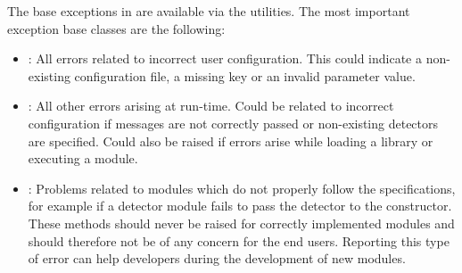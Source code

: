 The base exceptions in \apsq are available via the utilities.
The most important exception base classes are the following:
\begin{itemize}
\item {}: All errors related to incorrect user configuration.
This could indicate a non-existing configuration file, a missing key or an invalid parameter value.
\item {}: All other errors arising at run-time.
Could be related to incorrect configuration if messages are not correctly passed or non-existing detectors are specified.
Could also be raised if errors arise while loading a library or executing a module.
\item {}: Problems related to modules which do not properly follow the specifications, for example if a detector module fails to pass the detector to the constructor.
These methods should never be raised for correctly implemented modules and should therefore not be of any concern for the end users.
Reporting this type of error can help developers during the development of new modules.
\end{itemize}

